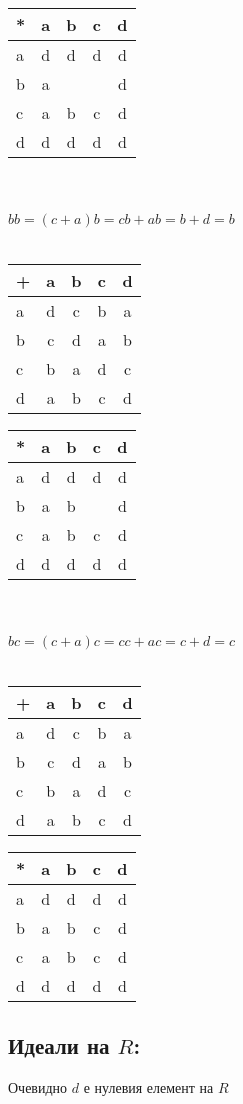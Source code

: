\documentclass[12pt]{article}
\begin{document}
	\begin{tabular}{ l | c c c c  }
	  * & a & b & c & d \\ \hline
	  a & d & d & d & d \\
	  b & a & ~ & ~ & d \\
	  c & a & b & c & d \\
	  d & d & d & d & d
	\end{tabular} \\\\
	\(bb = (c + a)b = cb + ab = b + d = b\) \\\\
	\begin{tabular}{ l | c c c c  }
	  + & a & b & c & d \\ \hline
	  a & d & c & b & a \\
	  b & c & d & a & b \\
	  c & b & a & d & c \\
	  d & a & b & c & d
	\end{tabular} \quad \quad \quad
	\begin{tabular}{ l | c c c c  }
	  * & a & b & c & d \\ \hline
	  a & d & d & d & d \\
	  b & a & b & ~ & d \\
	  c & a & b & c & d \\
	  d & d & d & d & d
	\end{tabular} \\\\
	\(bc = (c + a)c = cc + ac = c + d = c\) \\\\
	\begin{tabular}{ l | c c c c  }
	  + & a & b & c & d \\ \hline
	  a & d & c & b & a \\
	  b & c & d & a & b \\
	  c & b & a & d & c \\
	  d & a & b & c & d
	\end{tabular} \quad \quad \quad
	\begin{tabular}{ l | c c c c  }
	  * & a & b & c & d \\ \hline
	  a & d & d & d & d \\
	  b & a & b & c	 & d \\
	  c & a & b & c & d \\
	  d & d & d & d & d
	\end{tabular}
	\subsection*{Идеали на \(R\):}
	Очевидно \(d\) е нулевия елемент на \(R\)
\end{document}
